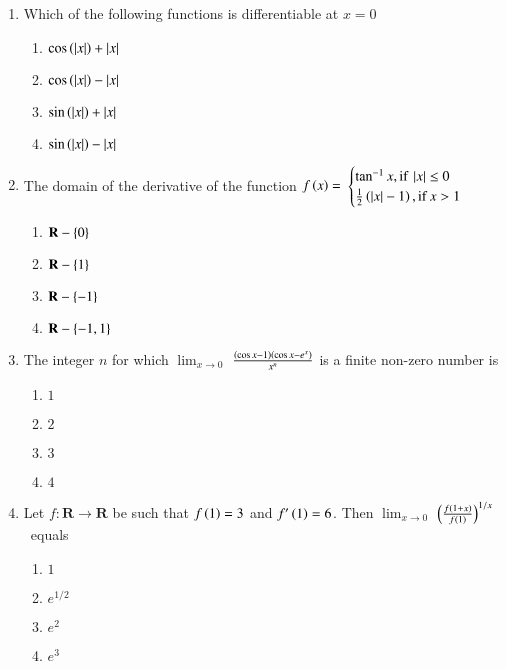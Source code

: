 \documentclass[journal,12pt,onecolumn]{IEEEtran}
\theoremstyle{remark}
\begin{document}
\begin{enumerate}
\item %

	Which of the following functions is differentiable at $x=0$ \hfill{}
    \begin{enumerate}
	    \item $\cos\left(\left\vert x\right\vert\right)+\left\vert x\right\vert$
	    \item $\cos\left(\left\vert x\right\vert\right)-\left\vert x\right\vert$
	    \item $\sin\left(\left\vert x\right\vert\right)+\left\vert x\right\vert$
	    \item $\sin\left(\left\vert x\right\vert\right)-\left\vert x\right\vert$\\
    \end{enumerate}


\item %

    The domain of the derivative of the function
		$f\left(x\right)=$
 $\begin{cases}
	\tan^{-1}x, \text{if} \: \left\vert x\right\vert\leq0 \\
    	\frac{1}{2}\left(\left\vert x\right\vert-1\right), \text{if} \: x > 1 
\end{cases} $ \  \hfill{}
    \begin{enumerate}
	    \item $\mathbf{R}-\left\{0\right\}$
	    \item $\mathbf{R}-\left\{1\right\}$
	    \item $\mathbf{R}-\left\{-1\right\}$
	    \item $\mathbf{R}-\left\{-1,1\right\}$\\
    \end{enumerate}


\item %

	The integer $n$ for which $\lim_{x \to 0}$ $\frac{\left(\cos x-1\right) \left(\cos x-e^{x}\right)}{x^{n}}$ is a finite non-zero number is \hfill{}
    \begin{enumerate}
     \item $1$
     \item $2$
     \item $3$
     \item $4$\\
    \end{enumerate}

\item %

	Let $f:\mathbf{R} \rightarrow \mathbf{R}$ be such that $f\left(1\right)=3$ and $f^{\prime}\left(1\right)=6$. Then $\lim_{x \to 0}$ $ \left( \frac{f\left(1+x\right)}{f\left(1\right)}\right)^{1/x}$\ equals \hfill{}
    \begin{enumerate}
     \item $1$
     \item $e^{1/2}$
     \item $e^2$
     \item $e^3$\\
    \end{enumerate}



\end{enumerate}
\end{document}
